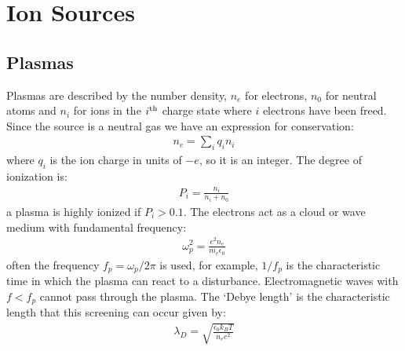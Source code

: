 \documentclass{article}
\numberwithin{equation}{section}
\begin{document}
\section{ Ion Sources }

\subsection{ Plasmas }

Plasmas are described by the number density, $n_e$ for electrons, $n_0$ for neutral atoms and $n_i$ for ions in the $i^{\rm th}$ charge state where $i$ electrons have been freed. Since the source is a neutral gas we have an expression for conservation:
\begin{align}
n_e = \sum_i q_i n_i
\end{align}
where $q_i$ is the ion charge in units of $-e$, so it is an integer. The degree of ionization is:
\begin{align}
P_i = \frac{n_i}{n_i + n_0}
\end{align}
a plasma is highly ionized if $P_i > 0.1$.
The electrons act as a cloud or wave medium with fundamental frequency:
\begin{align}
\omega_p^2 = \frac{e^2 n_e}{m_e \epsilon_0}
\end{align}
often the frequency $f_p = \omega_p / 2\pi$ is used, for example, $1/f_p$ is the characteristic time in which the plasma can react to a disturbance. Electromagnetic waves with $f < f_p$ cannot pass through the plasma. The `Debye length' is the characteristic length that this screening can occur given by:
\begin{align}
\lambda_D = \sqrt{\frac{\epsilon_0 k_B T}{n_e e^2}}
\end{align}
\end{document}

